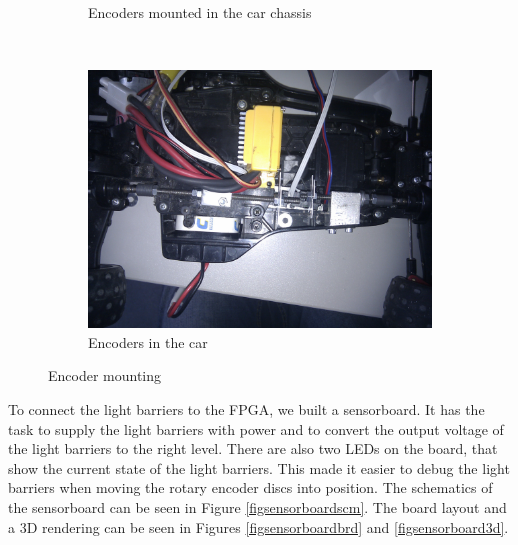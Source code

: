 \documentclass[a4paper
               ,10pt
               ,DIV=10 %
               ,BCOR=0.3cm
               ,pagesize %
               ,headings=small
               ,bibtotoc
               ]
               {scrartcl}
\begin{document}
\begin{figure}[H]
\begin{subfigure}[b]{0.3\textwidth}
  \caption{Encoders mounted in the car chassis}
  \label{figencmount2}
  \end{subfigure}~
  \begin{subfigure}[b]{0.3\textwidth}
  \centering
  \includegraphics[width=\textwidth]{pic/encoders_top.jpg}
  \caption{Encoders in the car}
  \label{figencmount3}
  \end{subfigure}
  \caption{Encoder mounting}
  \label{figservoboardbrd}
\end{figure}


To connect the light barriers to the FPGA, we built a sensorboard. It has the task to supply the light barriers with power and to convert the output voltage of the light barriers to the right level.
There are also two LEDs on the board, that show the current state of the light barriers.
This made it easier to debug the light barriers when moving the rotary encoder discs into position.
The schematics of the sensorboard can be seen in Figure \ref{figsensorboardscm}. The board layout and a 3D rendering can be seen in Figures \ref{figsensorboardbrd} and \ref{figsensorboard3d}.
\end{document}
